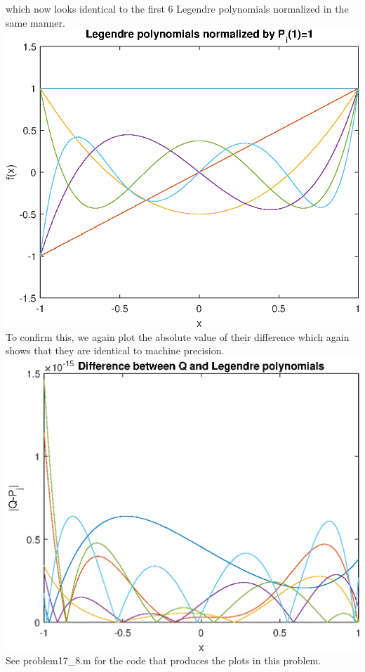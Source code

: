 \documentclass{article}
\begin{document}
which now looks identical to the first 6 Legendre polynomials normalized in the same manner. \\
\includegraphics[scale=0.6]{17_6.eps}\\
To confirm this, we again plot the absolute value of their difference which again shows that they are identical to machine precision. \\
\includegraphics[scale=0.6]{17_7.eps}\\
See problem17\_8.m for the code that produces the plots in this problem.
\end{document}
